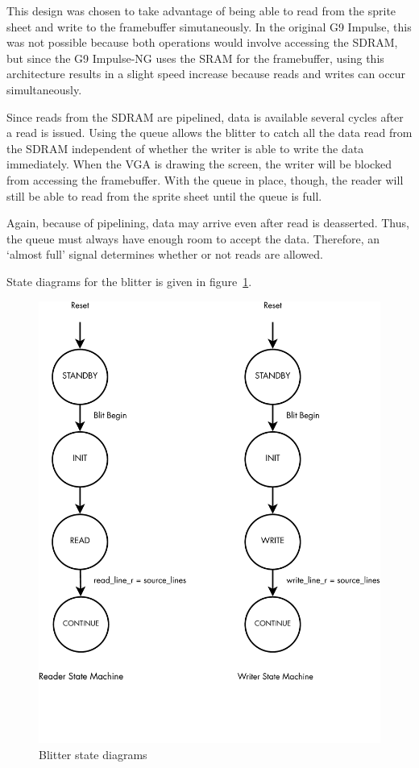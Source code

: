 \documentclass{report}
\begin{document}
This design was chosen to take advantage of being able to
read from the sprite sheet and write to the framebuffer simutaneously.
In the original G9 Impulse, this was not possible because both
operations would involve accessing the SDRAM, but since the G9
Impulse-NG uses the SRAM for the framebuffer, using this architecture
results in a slight speed increase because reads and writes can occur
simultaneously.

Since reads from the SDRAM are pipelined, data is available several
cycles after a read is issued. Using the queue allows the blitter to
catch all the data read from the SDRAM independent of whether the writer
is able to write the data immediately. When the VGA is drawing the
screen, the writer will be blocked from accessing the framebuffer. With the
queue in place, though, the reader will still be able to read from the
sprite sheet until the queue is full.

Again, because of pipelining, data may arrive even after read is
deasserted. Thus, the queue must always have enough room to accept the
data. Therefore, an `almost full' signal determines whether or not reads
are allowed.

State diagrams for the blitter is given in
figure~\ref{fig:blitter_state}.

\begin{figure}[htb!]
    \begin{center}
        \includegraphics[width=4.5in,trim=0 1.5in 0 0,clip=true]{blitter_state}
    \end{center}
    \caption{Blitter state diagrams}
    \label{fig:blitter_state}
\end{figure}
\end{document}
